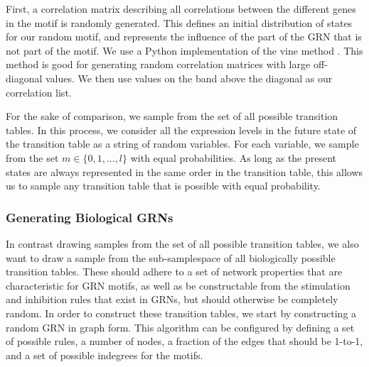 \documentclass[../main.tex]{subfiles}
\begin{document}
First, a correlation matrix describing all correlations between the different genes in the motif is randomly generated.
This defines an initial distribution of states for our random motif, and represents the influence of the part of the GRN that is not part of the motif.
We use a Python implementation of the vine method \cite{lewandowski2009generating}. %
This method is good for generating random correlation matrices with large off-diagonal values.
We then use values on the band above the diagonal as our correlation list. %

For the sake of comparison, we sample from the set of all possible transition tables.
In this process, we consider all the expression levels in the future state of the transition table as a string of random variables.
For each variable, we sample from the set $m \in \{0, 1, ..., l\}$ with equal probabilities. %
As long as the present states are always represented in the same order in the transition table, this allows us to sample any transition table that is possible with equal probability.

\subsubsection{Generating Biological GRNs}

In contrast drawing samples from the set of all possible transition tables, we also want to draw a sample from the sub-samplespace of all biologically possible transition tables.
These should adhere to a set of network properties that are characteristic for GRN motifs, as well as be constructable from the stimulation and inhibition rules that exist in GRNs, but should otherwise be completely random.
In order to construct these transition tables, we start by constructing a random GRN in graph form.
This algorithm can be configured by defining a set of possible rules, a number of nodes, a fraction of the edges that should be 1-to-1, and a set of possible indegrees for the motifs.
\end{document}
